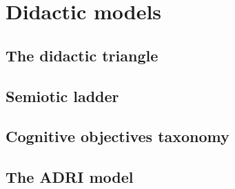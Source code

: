 \chapter{Didactic models}

\section{The didactic triangle}

\section{Semiotic ladder}

\section{Cognitive objectives taxonomy}

\section{The ADRI model}